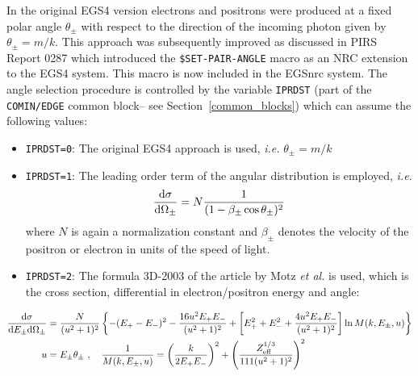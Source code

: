  
In the original EGS4 version electrons and positrons were 
produced at a fixed polar angle $\theta_{\pm}$ with respect to the direction 
of the incoming photon given by $\theta_{\pm}=m/k$. This approach 
was subsequently improved as discussed in PIRS Report 0287 
\cite{Bi91} which introduced the {\tt \$SET-PAIR-ANGLE} macro 
as an NRC extension to the EGS4 system. 
This macro is now included in the EGSnrc system. The angle 
selection procedure is controlled by the variable 
{\tt IPRDST} (part of the {\tt COMIN/EDGE} common block--
see Section~\ref{common_blocks}) which can assume the following values:
\begin{itemize}
\item[]{\tt IPRDST=0}: The original EGS4 approach is used, 
{\em i.e.} $\theta_{\pm}=m/k$
\item[]{\tt IPRDST=1}: The leading order term of the angular distribution 
is employed, {\em i.e.}
\begin{equation}
\label{pair_ang1}
{{\rm d} \sigma \over {\rm d} \Omega_\pm} = N 
{1 \over (1 - \beta_\pm \cos \theta_\pm)^2}
\end{equation}
where $N$ is again a normalization constant and $\beta_\pm$ denotes 
the velocity of the positron or electron in units of the speed of light.
\item[]{\tt IPRDST=2}: The formula 3D-2003 of the article by 
Motz {\em et al.} \cite{Mo69} is used, which is the cross section, differential 
in electron/positron energy and angle:
\end{itemize}
\begin{equation}
\label{pair_ang_2}
\begin{split}
{{\rm d} \sigma \over {\rm d} E_\pm {\rm d} \Omega_\pm} & =  
{N \over (u^2+1)^2 }
\left\{ -(E_+ - E_-)^2 - {16 u^2 E_+ E_- \over (u^2 + 1)^2} + 
\left[ E_+^2 + E_-^2 + {4 u^2 E_+ E_- \over (u^2 + 1)^2} \right] 
\ln M(k,E_\pm,u) \right\} \\
u & =  E_\pm \theta_\pm~, \quad {1 \over M(k,E_\pm,u)} = 
\left({k \over 2 E_+ E_-} \right)^2 + \left( { Z_{\rm eff}^{1/3} \over 
111 (u^2 + 1)^2 } \right)^2
\end{split}
\end{equation}
